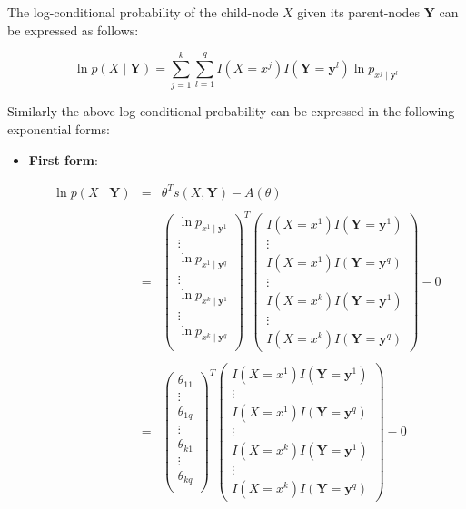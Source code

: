 \documentclass[11pt, oneside]{article}   	%
\numberwithin{figure}{section}
\numberwithin{equation}{section}
\numberwithin{table}{section}
\begin{document}
The log-conditional probability of the child-node $X$ given its parent-nodes $\mathbf{Y}$ can be expressed as follows:

$$ \ln p(X \mid \mathbf{Y}) = \sum_{j=1}^k \sum_{l=1}^q I(X=x^j) I(\mathbf{Y} =\mathbf{y}^l) \ln p_{x^j  \mid \mathbf{y}^l} $$

Similarly the above log-conditional probability can be expressed in the following exponential forms:

\begin{itemize}

\item \textbf{First form}:

\begin{eqnarray*}
\ln p(X \mid \mathbf{Y}) &=& \theta^T s(X,\mathbf{Y}) - A(\theta) \\\\
&=&
\begin{pmatrix}
\ln p_{x^1\mid \mathbf{y}^1}\\
\vdots \\
\ln p_{x^1\mid \mathbf{y}^q}\\
\vdots \\
\ln p_{x^k\mid \mathbf{y}^1}\\
\vdots \\
\ln p_{x^k\mid \mathbf{y}^q}\\
\end{pmatrix}^T
\begin{pmatrix}
I(X=x^1)I(\mathbf{Y}=\mathbf{y}^1) \\
\vdots \\
I(X=x^1)I(\mathbf{Y}=\mathbf{y}^q)\\
\vdots \\
I(X=x^k)I(\mathbf{Y}=\mathbf{y}^1) \\
\vdots \\
I(X=x^k)I(\mathbf{Y}=\mathbf{y}^q)
\end{pmatrix}
- 0 \\\\
&=&
\begin{pmatrix}
\theta_{11}\\
\vdots \\
\theta_{1q}\\
\vdots \\
\theta_{k1}\\
\vdots \\
\theta_{kq}\\
\end{pmatrix}^T
\begin{pmatrix}
I(X=x^1) I(\mathbf{Y}=\mathbf{y}^1) \\
\vdots \\
I(X=x^1) I(\mathbf{Y}=\mathbf{y}^q)\\
\vdots \\
I(X=x^k) I(\mathbf{Y}=\mathbf{y}^1) \\
\vdots \\
I(X=x^k) I(\mathbf{Y}=\mathbf{y}^q)
\end{pmatrix}
- 0
\end{eqnarray*}


\end{itemize}
\end{document}
